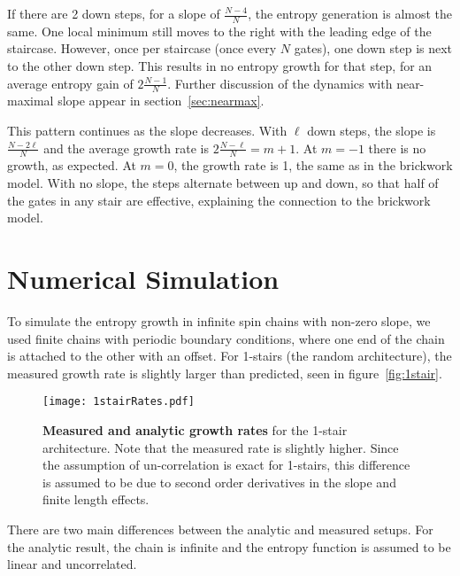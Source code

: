 \documentclass[11pt]{article}
\renewcommand{\l}{\ell}
\begin{document}
If there are 2 down steps, for a slope of $\frac{N-4}{N}$, the entropy generation is almost the same. One local minimum still moves to the right with the leading edge of the staircase. However, once per staircase (once every $N$ gates), one down step is next to the other down step. This results in no entropy growth for that step, for an average entropy gain of $2\frac{N-1}{N}$. Further discussion of the dynamics with near-maximal slope appear in section~\ref{sec:nearmax}.

This pattern continues as the slope decreases. With $\l$ down steps, the slope is $\frac{N-2\l}{N}$ and the average growth rate is $2\frac{N-\l}{N} = m+1$. At $m = -1$ there is no growth, as expected. At $m=0$, the growth rate is 1, the same as in the brickwork model. With no slope, the steps alternate between up and down, so that half of the gates in any stair are effective, explaining the connection to the brickwork model.

\section{Numerical Simulation} \label{sec:num}

To simulate the entropy growth in infinite spin chains with non-zero slope, we used finite chains with periodic boundary conditions, where one end of the chain is attached to the other with an offset. For 1-stairs (the random architecture), the measured growth rate is slightly larger than predicted, seen in figure~\ref{fig:1stair}.
\begin{figure}
	\centering
	\texttt{[image: 1stairRates.pdf]}
	\caption{\textbf{Measured and analytic growth rates} for the 1-stair architecture. Note that the measured rate is slightly higher. Since the assumption of un-correlation is exact for 1-stairs, this difference is assumed to be due to second order derivatives in the slope and finite length effects.}
\end{figure}
There are two main differences between the analytic and measured setups. For the analytic result, the chain is infinite and the entropy function is assumed to be linear and uncorrelated. 





\printbibliography
\end{document}
